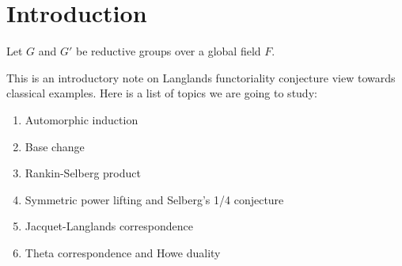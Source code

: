 \section{Introduction}

\begin{conjecture} Let $G$ and $G'$ be reductive groups over a global field $F$. 
\end{conjecture}
This is an introductory note on Langlands functoriality conjecture view towards classical examples. Here is a list of topics we are going to study:

\begin{enumerate}
    \item Automorphic induction
    \item Base change
    \item Rankin-Selberg product
    \item Symmetric power lifting and Selberg's 1/4 conjecture
    \item Jacquet-Langlands correspondence
    \item Theta correspondence and Howe duality
\end{enumerate}